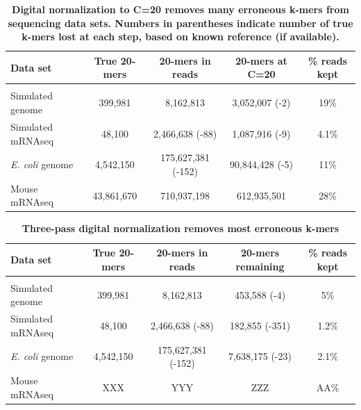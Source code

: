 \documentclass[10pt]{article}
\begin{document}
\begin{table}[!ht]
\caption{
\bf{Digital normalization to C=20 removes many erroneous k-mers from sequencing data sets.  Numbers
in parentheses indicate number of true k-mers lost at each step, based on known reference (if available).}}
\begin{tabular}{|l|c|c|c|c|}
Data set & True 20-mers & 20-mers in reads & 20-mers at C=20 & \% reads kept\\
\hline \\
Simulated genome & 399,981 & 8,162,813 & 3,052,007 (-2) & 19\% \\
Simulated mRNAseq & 48,100 & 2,466,638 (-88) & 1,087,916 (-9) & 4.1\% \\
{\em E. coli} genome & 4,542,150 & 175,627,381 (-152) & 90,844,428 (-5) & 11\% \\
Mouse mRNAseq & 43,861,670 & 710,937,198 & 612,935,501 & 28\% \\

\end{tabular}
\begin{flushleft}
\end{flushleft}
\label{tab:normC20}
\end{table}


\begin{table}[!ht]
\caption{
\bf{Three-pass digital normalization removes most erroneous k-mers}}
\begin{tabular}{|l|c|c|c|c|}
Data set & True 20-mers & 20-mers in reads & 20-mers remaining & \% reads kept\\
\hline \\
Simulated genome & 399,981 & 8,162,813 & 453,588 (-4) & 5\% \\
Simulated mRNAseq & 48,100 & 2,466,638 (-88) & 182,855 (-351) & 1.2\% \\
{\em E. coli} genome & 4,542,150 & 175,627,381 (-152) & 7,638,175 (-23) & 2.1\% \\
Mouse mRNAseq & XXX & YYY & ZZZ & AA\% \\
\end{tabular}
\begin{flushleft}
\end{flushleft}
\label{tab:normC5}
\end{table}

\end{document}
